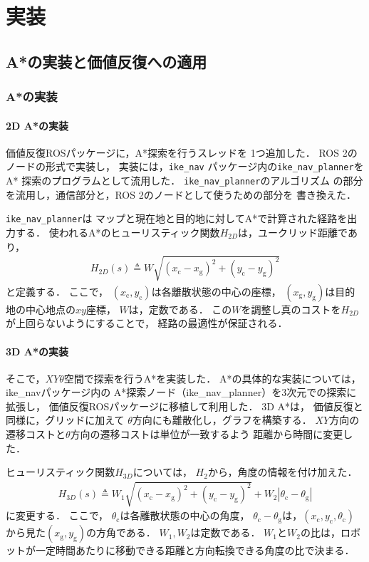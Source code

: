 \chapter{実装}\label{chap:implement}

\section{A*の実装と価値反復への適用}
\subsection{A*の実装}
\subsubsection{2D A*の実装}
価値反復ROSパッケージに，A*探索を行うスレッドを
1つ追加した．
ROS 2のノードの形式で実装し，
実装には，\texttt{ike\_nav}\cite{池邉2023ikenav}
パッケージ内の\texttt{ike\_nav\_planner}をA*
探索のプログラムとして流用した．
\texttt{ike\_nav\_planner}のアルゴリズム
の部分を流用し，通信部分と，ROS 2のノードとして使うための部分を
書き換えた．

\texttt{ike\_nav\_planner}は
マップと現在地と目的地に対してA*で計算された経路を出力する．
使われるA*のヒューリスティック関数$H_{2D}$は，ユークリッド距離であり，
\begin{align}
	H_{2D}(s) \triangleq W \sqrt{  (x_\text{c} - x_\text{g})^2 + (y_\text{c} - y_\text{g})^2 }
        \label{eq:2d-astar-heurisic}
\end{align}
と定義する．
ここで，
$(x_\text{c}, y_\text{c})$は各離散状態の中心の座標，
$(x_\text{g}, y_\text{g})$は目的地の中心地点の$xy$座標，
$W$は，定数である．
この$W$を調整し真のコストを$H_{2D}$が上回らないようにすることで，
経路の最適性が保証される．


\subsubsection{3D A*の実装}
そこで，$XY\theta$空間で探索を行うA*を実装した．
A*の具体的な実装については，
ike\_nav\cite{池邉2023ikenav}パッケージ内の
A*探索ノード（ike\_nav\_planner）を3次元での探索に拡張し，
価値反復ROSパッケージに移植して利用した．
3D A*は，
価値反復と同様に，グリッドに加えて
$\theta$方向にも離散化し，グラフを構築する．
$XY$方向の遷移コストと$\theta$方向の遷移コストは単位が一致するよう
距離から時間に変更した．

ヒューリスティック関数$H_{3D}$については，
$H_2$から，角度の情報を付け加えた．
\begin{align}
	H_{3D}(s) \triangleq W_1 \sqrt{  (x_\text{c} - x_\text{g})^2 + (y_\text{c} - y_\text{g})^2 }
	+ W_2 | \theta_\text{c} - \theta_\text{g} | 
	\label{eq:3d-astar-heurisic}
\end{align}
に変更する．
ここで，
$\theta_\text{c}$は各離散状態の中心の角度，
$\theta_\text{c} - \theta_\text{g}$は，$(x_\text{c}, y_\text{c}, \theta_\text{c})$
から見た$(x_\text{g}, y_\text{g})$の方角である．
$W_1, W_2$は定数である．
$W_1$と$W_2$の比は，ロボットが一定時間あたりに移動できる距離と方向転換できる角度の比で決まる．



